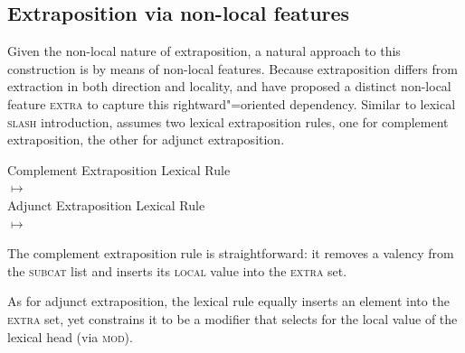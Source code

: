 \documentclass[output=paper
,notxmath 
	        ,collection
	        ,collectionchapter
 	        ,biblatex
                ,babelshorthands
                ,newtxmath
                ,draftmode
                ,colorlinks, citecolor=brown
]{langscibook}
\begin{document}
\subsection{Extraposition via non-local features}

Given the non-local nature of extraposition, a natural approach to
this construction is by means of non-local features. Because
extraposition differs from extraction in both direction and locality,
\citet{Keller:95} and \citet[Section~13.2]{Mueller99a}
have proposed a distinct non-local feature \textsc{extra} to capture
this rightward"=oriented dependency. 
Similar to lexical \textsc{slash} introduction, \citet[]{Keller:95} assumes two lexical
extraposition rules, one for  complement extraposition, the other for
adjunct extraposition. 

\ea
Complement Extraposition Lexical Rule\\

$\mapsto$ \\
\flushright {}
\z
\eas
Adjunct Extraposition Lexical Rule\\
$\mapsto$ \\
\flushright{}
\zs

The complement extraposition rule is straightforward: it removes a
valency from the \textsc{subcat} list and inserts its \textsc{local}
value into the \textsc{extra} set. 

As for adjunct extraposition, the lexical rule  equally inserts an
element into the \textsc{extra} set, yet constrains it to be a
modifier that selects for the local value of the lexical head (via
\textsc{mod}). 
\end{document}
